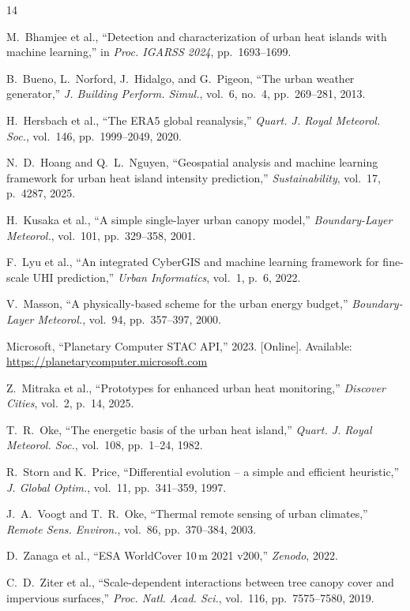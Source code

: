 \documentclass[conference]{IEEEtran}
\begin{document}

\begin{thebibliography}{14}

M.~Bhamjee et al., ``Detection and characterization of urban heat islands
with machine learning,'' in \textit{Proc. IGARSS 2024}, pp.~1693--1699.

B.~Bueno, L.~Norford, J.~Hidalgo, and G.~Pigeon, ``The urban weather
generator,'' \textit{J. Building Perform. Simul.}, vol.~6, no.~4,
pp.~269--281, 2013.

H.~Hersbach et al., ``The ERA5 global reanalysis,''
\textit{Quart. J. Royal Meteorol. Soc.}, vol.~146, pp.~1999--2049, 2020.

N.~D.~Hoang and Q.~L.~Nguyen, ``Geospatial analysis and machine learning
framework for urban heat island intensity prediction,''
\textit{Sustainability}, vol.~17, p.~4287, 2025.

H.~Kusaka et al., ``A simple single-layer urban canopy model,''
\textit{Boundary-Layer Meteorol.}, vol.~101, pp.~329--358, 2001.

F.~Lyu et al., ``An integrated CyberGIS and machine learning framework for
fine-scale UHI prediction,'' \textit{Urban Informatics}, vol.~1, p.~6, 2022.

V.~Masson, ``A physically-based scheme for the urban energy budget,''
\textit{Boundary-Layer Meteorol.}, vol.~94, pp.~357--397, 2000.

Microsoft, ``Planetary Computer STAC API,'' 2023. [Online].
Available: \url{https://planetarycomputer.microsoft.com}

Z.~Mitraka et al., ``Prototypes for enhanced urban heat monitoring,''
\textit{Discover Cities}, vol.~2, p.~14, 2025.

T.~R.~Oke, ``The energetic basis of the urban heat island,''
\textit{Quart. J. Royal Meteorol. Soc.}, vol.~108, pp.~1--24, 1982.

R.~Storn and K.~Price, ``Differential evolution -- a simple and efficient
heuristic,'' \textit{J. Global Optim.}, vol.~11, pp.~341--359, 1997.

J.~A.~Voogt and T.~R.~Oke, ``Thermal remote sensing of urban climates,''
\textit{Remote Sens. Environ.}, vol.~86, pp.~370--384, 2003.

D.~Zanaga et al., ``ESA WorldCover 10\,m 2021 v200,'' \textit{Zenodo}, 2022.

C.~D.~Ziter et al., ``Scale-dependent interactions between tree canopy cover
and impervious surfaces,'' \textit{Proc. Natl. Acad. Sci.}, vol.~116,
pp.~7575--7580, 2019.

\end{thebibliography}
\end{document}
